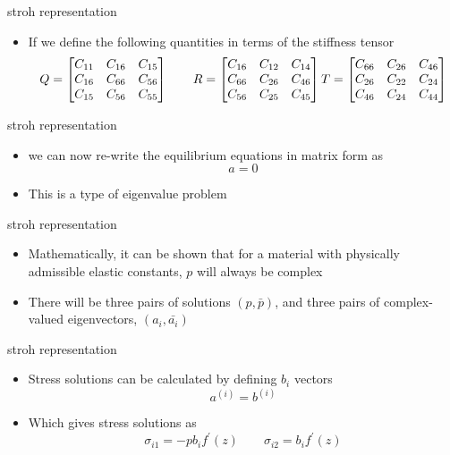 \documentclass[
  letterpaper,
  ignorenonframetext,
  aspectratio=43,
  handout,
  12pt]{beamer}
\providecommand{\tightlist}{%
  \setlength{\itemsep}{0pt}\setlength{\parskip}{0pt}}
\providecommand{\tightlist}{%
\setlength{\itemsep}{0pt}\setlength{\parskip}{0pt}}
\begin{document}
\begin{frame}{stroh representation}
\protect\hypertarget{stroh-representation-3}{}
\begin{itemize}
\tightlist
\item
  If we define the following quantities in terms of the stiffness tensor
  \[Q = \begin{bmatrix}
    C_{11} & C_{16} & C_{15}\\
    C_{16} & C_{66} & C_{56}\\
    C_{15} & C_{56} & C_{55}
  \end{bmatrix} \qquad R = \begin{bmatrix}
    C_{16} & C_{12} & C_{14}\\
    C_{66} & C_{26} & C_{46}\\
    C_{56} & C_{25} & C_{45}
  \end{bmatrix} \\ T = \begin{bmatrix}
    C_{66} & C_{26} & C_{46}\\
    C_{26} & C_{22} & C_{24}\\
    C_{46} & C_{24} & C_{44}
  \end{bmatrix}\]
\end{itemize}
\end{frame}

\begin{frame}{stroh representation}
\protect\hypertarget{stroh-representation-4}{}
\begin{itemize}
\item
  we can now re-write the equilibrium equations in matrix form as
  \[a=0\]
\item
  This is a type of eigenvalue problem
\end{itemize}
\end{frame}

\begin{frame}{stroh representation}
\protect\hypertarget{stroh-representation-5}{}
\begin{itemize}
\tightlist
\item
  Mathematically, it can be shown that for a material with physically
  admissible elastic constants, \(p\) will always be complex
\item
  There will be three pairs of solutions \((p,\bar{p})\), and three
  pairs of complex-valued eigenvectors, \((a_i,\bar{a_i})\)
\end{itemize}
\end{frame}

\begin{frame}{stroh representation}
\protect\hypertarget{stroh-representation-6}{}
\begin{itemize}
\item
  Stress solutions can be calculated by defining \(b_i\) vectors
  \[a^{(i)} = b^{(i)}\]
\item
  Which gives stress solutions as
  \[\sigma_{i1} = -pb_if^\prime(z) \qquad \sigma_{i2} = b_i f^\prime(z)\]
\end{itemize}
\end{frame}
\end{document}
